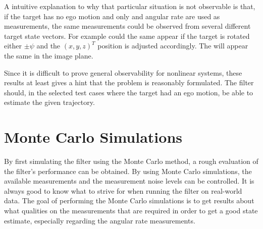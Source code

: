 A intuitive explanation to why that particular situation is not observable is that, if the target has no ego motion and only \abbrROI and angular rate are used as measurements, the same \abbrROI measurements could be observed from several different target state vectors.
For example could the same \abbrROI appear if the target is rotated either $\pm\psi$ and the $(x,y,z)^T$ position is adjusted accordingly.
The \abbrROI will appear the same in the image plane.

Since it is difficult to prove general observability for nonlinear systems, these results at least gives a hint that the problem is reasonably formulated.
The filter should, in the selected test cases where the target had an ego motion, be able to estimate the given trajectory.

\newpage

\section{Monte Carlo Simulations}
\label{sec:montecarloresult}
By first simulating the filter using the Monte Carlo method, a rough evaluation of the filter's performance can be obtained.
By using Monte Carlo simulations, the available measurements and the measurement noise levels can be controlled.
It is always good to know what to strive for when running the filter on real-world data.
The goal of performing the Monte Carlo simulations is to get results about what qualities on the measurements that are required in order to get a good state estimate, especially regarding the angular rate measurements.

